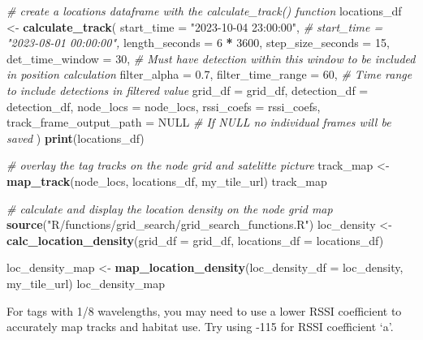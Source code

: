 \documentclass[
]{book}
\newenvironment{Shaded}{\begin{snugshade}}{\end{snugshade}}
\newcommand{\AttributeTok}[1]{\textcolor[rgb]{0.13,0.29,0.53}{#1}}
\newcommand{\CommentTok}[1]{\textcolor[rgb]{0.56,0.35,0.01}{\textit{#1}}}
\newcommand{\ConstantTok}[1]{\textcolor[rgb]{0.56,0.35,0.01}{#1}}
\newcommand{\DecValTok}[1]{\textcolor[rgb]{0.00,0.00,0.81}{#1}}
\newcommand{\FloatTok}[1]{\textcolor[rgb]{0.00,0.00,0.81}{#1}}
\newcommand{\FunctionTok}[1]{\textcolor[rgb]{0.13,0.29,0.53}{\textbf{#1}}}
\newcommand{\NormalTok}[1]{#1}
\newcommand{\OtherTok}[1]{\textcolor[rgb]{0.56,0.35,0.01}{#1}}
\newcommand{\SpecialCharTok}[1]{\textcolor[rgb]{0.81,0.36,0.00}{\textbf{#1}}}
\newcommand{\StringTok}[1]{\textcolor[rgb]{0.31,0.60,0.02}{#1}}
\begin{document}
\begin{Shaded}
\begin{Highlighting}[]
\CommentTok{\# create a locations dataframe with the calculate\_track() function}
\NormalTok{locations\_df }\OtherTok{\textless{}{-}} \FunctionTok{calculate\_track}\NormalTok{(}
  \AttributeTok{start\_time =} \StringTok{"2023{-}10{-}04 23:00:00"}\NormalTok{,}
  \CommentTok{\# start\_time = "2023{-}08{-}01 00:00:00",}
  \AttributeTok{length\_seconds =} \DecValTok{6} \SpecialCharTok{*} \DecValTok{3600}\NormalTok{,}
  \AttributeTok{step\_size\_seconds =} \DecValTok{15}\NormalTok{,}
  \AttributeTok{det\_time\_window =} \DecValTok{30}\NormalTok{, }\CommentTok{\# Must have detection within this window to be included in position calculation}
  \AttributeTok{filter\_alpha =} \FloatTok{0.7}\NormalTok{,}
  \AttributeTok{filter\_time\_range =} \DecValTok{60}\NormalTok{, }\CommentTok{\# Time range to include detections in filtered value}
  \AttributeTok{grid\_df =}\NormalTok{ grid\_df,}
  \AttributeTok{detection\_df =}\NormalTok{ detection\_df,}
  \AttributeTok{node\_locs =}\NormalTok{ node\_locs,}
  \AttributeTok{rssi\_coefs =}\NormalTok{ rssi\_coefs,}
  \AttributeTok{track\_frame\_output\_path =} \ConstantTok{NULL} \CommentTok{\# If NULL no individual frames will be saved}
\NormalTok{)}
\FunctionTok{print}\NormalTok{(locations\_df)}

\CommentTok{\# overlay the tag tracks on the node grid and satelitte picture}
\NormalTok{track\_map }\OtherTok{\textless{}{-}} \FunctionTok{map\_track}\NormalTok{(node\_locs, }
\NormalTok{                       locations\_df, }
\NormalTok{                       my\_tile\_url)}
\NormalTok{track\_map}

\CommentTok{\# calculate and display the location density on the node grid map}
\FunctionTok{source}\NormalTok{(}\StringTok{"R/functions/grid\_search/grid\_search\_functions.R"}\NormalTok{)}
\NormalTok{loc\_density }\OtherTok{\textless{}{-}} \FunctionTok{calc\_location\_density}\NormalTok{(}\AttributeTok{grid\_df =}\NormalTok{ grid\_df, }
                                     \AttributeTok{locations\_df =}\NormalTok{ locations\_df)}

\NormalTok{loc\_density\_map }\OtherTok{\textless{}{-}} \FunctionTok{map\_location\_density}\NormalTok{(}\AttributeTok{loc\_density\_df =}\NormalTok{ loc\_density, my\_tile\_url)}
\NormalTok{loc\_density\_map}
\end{Highlighting}
\end{Shaded}

For tags with 1/8 wavelengths, you may need to use a lower RSSI coefficient to accurately map tracks and habitat use. Try using -115 for RSSI coefficient `a'.
\end{document}

